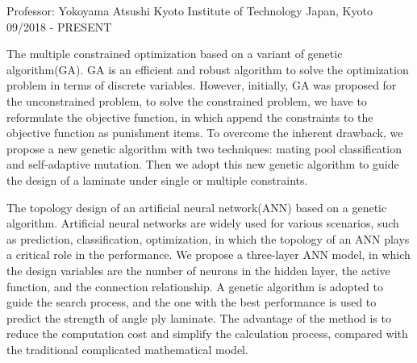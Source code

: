 
\begin{cventries}

  \cventry
    {Professor: Yokoyama Atsushi} %
    {Kyoto Institute of Technology} %
    {Japan, Kyoto} %
    {09/2018 - PRESENT} %
    {
      \begin{cvitems} %
	  \item{The multiple constrained optimization based on a variant of genetic algorithm(GA). GA is an efficient and robust algorithm to solve the optimization problem in terms of discrete variables. However, initially, GA was proposed for the unconstrained problem, to solve the constrained problem, we have to reformulate the objective function, in which append the constraints to the objective function as punishment items. To overcome the inherent drawback, we propose a new genetic algorithm with two techniques: mating pool classification and self-adaptive mutation. Then we adopt this new genetic algorithm to guide the design of a laminate under single or multiple constraints.}
	  \item{ The topology design of an artificial neural network(ANN) based on a genetic algorithm. Artificial neural networks are widely used for various scenarios, such as prediction, classification, optimization, in which the topology of an ANN plays a critical role in the performance. We propose a three-layer ANN model, in which the design variables are the number of neurons in the hidden layer, the active function, and the connection relationship. A genetic algorithm is adopted to guide the search process, and the one with the best performance is used to predict the strength of angle ply laminate. The advantage of the method is to reduce the computation cost and simplify the calculation process, compared with the traditional complicated mathematical model.  }
      \end{cvitems}
    }
    			

\end{cventries}
